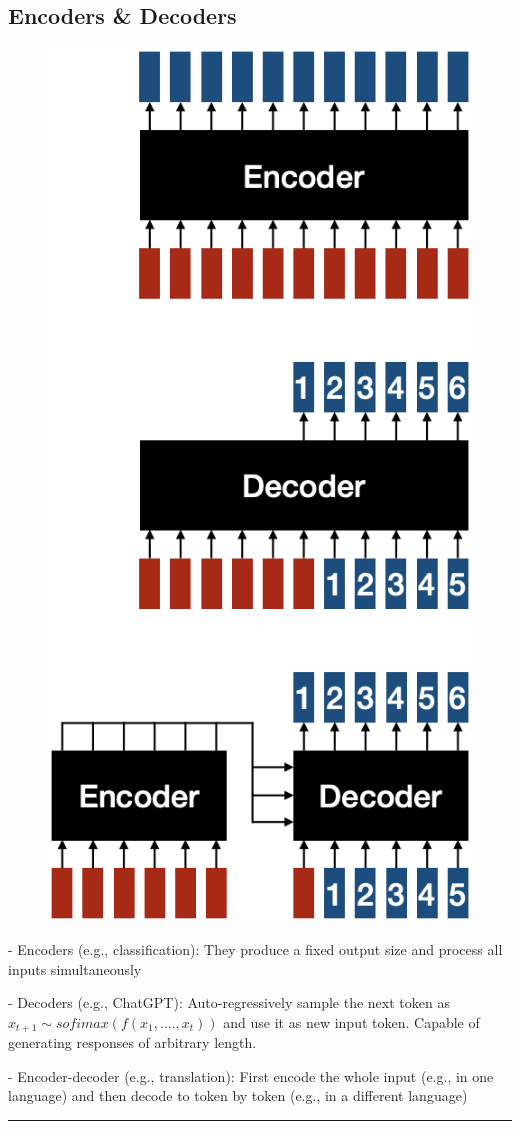 \subsection{Encoders \& Decoders}

\begin{figure} 
  \centering
  \includegraphics[width=0.3\columnwidth]{figures/encoders_decoders.png}
\end{figure}

- Encoders (e.g., classification): They produce a fixed output size and process all inputs simultaneously

- Decoders (e.g., ChatGPT): Auto-regressively sample the next token as $x_{t+1}\sim s o f i m a x(f(x_{1},....,x_{t}))$ and use it as new input token. Capable of generating responses of arbitrary length.

- Encoder-decoder (e.g., translation): First encode the whole input (e.g., in one language) and then decode to token by token (e.g., in a different language)

\vspace{4pt}
\hrule
\vspace{4pt}